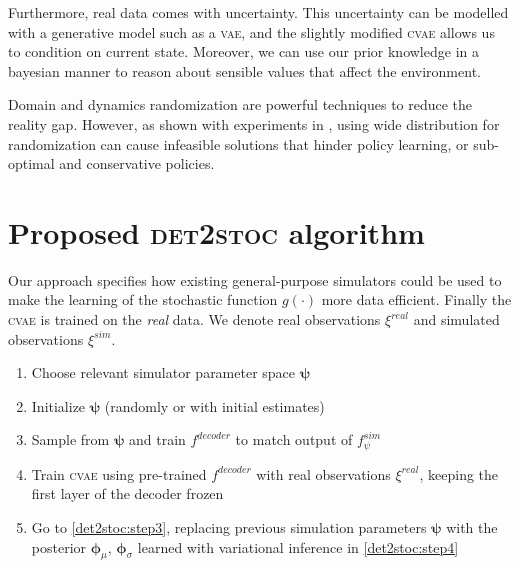 \documentclass{kththesis}
\makeatletter
\newcommand{\vz}{\boldsymbol{z}}
\newcommand{\vph}{\boldsymbol{\phi}}
\newcommand{\vpsi}{\vec{\psi}}
\renewcommand{\vec}[1]{\boldsymbol{#1}}
\newcommand{\@giventhatstar}[2]{\ensuremath{\left({#1}\;\middle|\;{#2}\right)}}
\newcommand{\@giventhatnostar}[3][]{#1(#2\,#1|\,#3#1)}
\newcommand{\given}{\@ifstar\@giventhatstar\@giventhatnostar}
\newcommand{\N}{\mathcal{N}}
\newcommand{\vae}{\textsc{vae}}
\newcommand{\cvae}{\textsc{cvae}}
\newcommand{\dettostoc}{\textsc{det2stoc}}
\newcommand{\vs}{\pmb{s}_t}
\newcommand{\va}{\pmb{a}_t}
\newcommand{\vns}{\pmb{s}_{t+1}}
\newcommand{\fpsisimulator}{\ensuremath{f^{sim}_{\psi}}}
\newcommand{\fdecoder}{\ensuremath{f^{decoder}}}
\newcommand{\qphi}{q_{\phi}}
\newcommand{\trajsim}{\xi^{sim}}
\newcommand{\trajreal}{\xi^{real}}
\makeatother
\begin{document}
Furthermore, real data comes with uncertainty. This uncertainty can be modelled with a generative model such as a \vae{}, and the slightly modified \cvae{} allows us to condition on current state. Moreover, we can use our prior knowledge in a bayesian manner to reason about sensible values that affect the environment.

Domain and dynamics randomization are powerful techniques to reduce the reality gap. However, as shown with experiments in \parencite{Chebotar2018}, using wide distribution for randomization can cause infeasible solutions that hinder policy learning, or sub-optimal and conservative policies.


\section{Proposed \dettostoc{} algorithm}
\label{det2stoc:algorithm}

Our approach specifies how existing general-purpose simulators could be used to make the learning of the stochastic function $g(\cdot)$ more data efficient. Finally the \cvae{} is trained on the \emph{real} data. We denote real observations $\trajreal$ and simulated observations $\trajsim$.


\begin{enumerate}[label=\textit{Step \arabic*}]
    \item \label{det2stoc:step1} Choose relevant simulator parameter space $\vpsi$
    \item \label{det2stoc:step2} Initialize $\vpsi$ (randomly or with initial estimates)
    \item \label{det2stoc:step3} Sample from $\vpsi$ and train $\fdecoder{}$ to match output of $\fpsisimulator{}$ 
    \item \label{det2stoc:step4} Train \cvae{} using pre-trained $\fdecoder{}$ with real observations $\trajreal$, keeping the first layer of the decoder frozen

    \item \label{det2stoc:step5} Go to \ref{det2stoc:step3}, replacing previous simulation parameters $\vpsi$ with the posterior $\vph_{\mu}$, $\vph_{\sigma}$ learned with variational inference in \ref{det2stoc:step4}
\end{enumerate}
\end{document}
